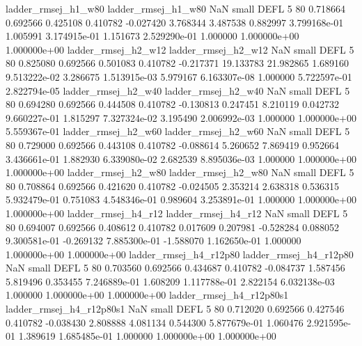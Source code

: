      ladder_rmsej_h1_w80      ladder_rmsej_h1_w80                   NaN      small     DEFL                 5 80 0.718664       0.692566 0.425108       0.410782   -0.027420      3.768344      3.487538     0.882997   3.799168e-01  1.005991 3.174915e-01     1.151673   2.529290e-01            1.000000    1.000000e+00        1.000000e+00
     ladder_rmsej_h2_w12      ladder_rmsej_h2_w12                   NaN      small     DEFL                 5 80 0.825080       0.692566 0.501083       0.410782   -0.217371     19.133783     21.982865     1.689160   9.513222e-02  3.286675 1.513915e-03     5.979167   6.163307e-08            1.000000    5.722597e-01        2.822794e-05
     ladder_rmsej_h2_w40      ladder_rmsej_h2_w40                   NaN      small     DEFL                 5 80 0.694280       0.692566 0.444508       0.410782   -0.130813      0.247451      8.210119     0.042732   9.660227e-01  1.815297 7.327324e-02     3.195490   2.006992e-03            1.000000    1.000000e+00        5.559367e-01
     ladder_rmsej_h2_w60      ladder_rmsej_h2_w60                   NaN      small     DEFL                 5 80 0.729000       0.692566 0.443108       0.410782   -0.088614      5.260652      7.869419     0.952664   3.436661e-01  1.882930 6.339080e-02     2.682539   8.895036e-03            1.000000    1.000000e+00        1.000000e+00
     ladder_rmsej_h2_w80      ladder_rmsej_h2_w80                   NaN      small     DEFL                 5 80 0.708864       0.692566 0.421620       0.410782   -0.024505      2.353214      2.638318     0.536315   5.932479e-01  0.751083 4.548346e-01     0.989604   3.253891e-01            1.000000    1.000000e+00        1.000000e+00
     ladder_rmsej_h4_r12      ladder_rmsej_h4_r12                   NaN      small     DEFL                 5 80 0.694007       0.692566 0.408612       0.410782    0.017609      0.207981     -0.528284     0.088052   9.300581e-01 -0.269132 7.885300e-01    -1.588070   1.162650e-01            1.000000    1.000000e+00        1.000000e+00
  ladder_rmsej_h4_r12p80   ladder_rmsej_h4_r12p80                   NaN      small     DEFL                 5 80 0.703560       0.692566 0.434687       0.410782   -0.084737      1.587456      5.819496     0.353455   7.246889e-01  1.608209 1.117788e-01     2.822154   6.032138e-03            1.000000    1.000000e+00        1.000000e+00
ladder_rmsej_h4_r12p80s1 ladder_rmsej_h4_r12p80s1                   NaN      small     DEFL                 5 80 0.712020       0.692566 0.427546       0.410782   -0.038430      2.808888      4.081134     0.544300   5.877679e-01  1.060476 2.921595e-01     1.389619   1.685485e-01            1.000000    1.000000e+00        1.000000e+00
